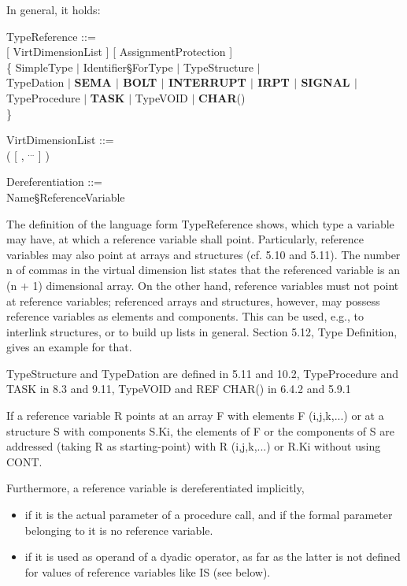 \begin{tobedone}
In general, it holds:

\begin{front}
TypeReference ::=\\
 [ VirtDimensionList ] [ AssignmentProtection ]\\
\x \{ SimpleType $\mid$ Identifier\S ForType $\mid$ TypeStructure $\mid$\\
\x \x TypeDation $\mid$ {\bf SEMA $\mid$ BOLT $\mid$ INTERRUPT $\mid$ IRPT $\mid$ SIGNAL $\mid$} \\
\x \x TypeProcedure $\mid$ {\bf TASK} $\mid$ TypeVOID $\mid$ {\bf CHAR}()\\
\x \}

VirtDimensionList ::=\\
\x ( [ , $^{...}$ ] )

Dereferentiation ::=\\
 Name\S ReferenceVariable

\end{front}
\begin{grammar}



\end{grammar}

The definition of the language form TypeReference shows, which type a
variable may have, at which a reference variable shall point.
Particularly, reference variables may also point at arrays and
structures (cf. 5.10 and 5.11). The number n of commas in the virtual
dimension list states that the referenced variable is an (n + 1)
dimensional array. On the other hand, reference variables must not point
at reference variables; referenced arrays and structures, however, may
possess reference variables as elements and components. This can be
used, e.g., to interlink structures, or to build up lists in general.
Section 5.12, Type Definition, gives an example for that.

TypeStructure and TypeDation are defined in 5.11 and 10.2, TypeProcedure and 
TASK in 8.3 and 9.11, TypeVOID and REF CHAR() in 6.4.2
and 5.9.1

If a reference variable R points at an array F with elements F
(i,j,k,...) or at a structure S with components S.Ki, the elements of F
or the components of S are addressed (taking R as starting-point) with R
(i,j,k,...) or R.Ki without using CONT.

Furthermore, a reference variable is dereferentiated implicitly,
\begin{itemize}
\item if it is the actual parameter of a procedure call, and if the
formal parameter belonging to it is no reference variable.
\item if it is used as operand of a dyadic operator, as far as the
latter is not defined for values of reference variables like IS (see
below).
\end{itemize}


\end{tobedone}
